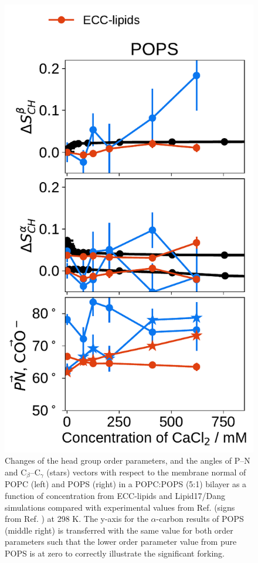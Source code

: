 \documentclass[journal=jpcbfk,manuscript=article]{achemso}
\newlength{\figheight}
\begin{document}
\begin{figure}[tbp!]
  \includegraphics[height=\figheight]{../img/ecc_pops/order_parameters_changes_ecc-lip_L14_A-B-PN-COO_POPS_cacl.pdf} 
  \caption{\label{fig:delta_ordPar_CaCl_PCPS} 
    Changes of the head group order parameters, and the angles of P--N and C$_\beta$--C$_\gamma$ (stars) vectors 
    with respect to the membrane normal of POPC (left) and POPS (right) in a POPC:POPS (5:1) bilayer 
    as a function of  concentration from ECC-lipids and Lipid17/Dang simulations 
    compared with experimental values from Ref.  (signs from Ref. ) at 298 K.
    The y-axis for the $\alpha$-carbon results of POPS (middle right) is transferred
    with the same value for both order parameters such that the lower order
    parameter value from pure POPS is at zero to correctly illustrate the significant forking.
  }
\end{figure} 
\end{document}
